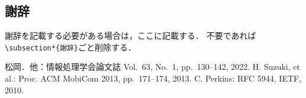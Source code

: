 \documentclass[a4j,9pt,twocolumn,uplatex]{jsarticle}
\begin{document}
\subsection*{謝辞}
謝辞を記載する必要がある場合は，ここに記載する．
不要であれば\verb|\subsection*{謝辞}|ごと削除する．


\begin{thebibliography}{9}      %
     松岡．他：情報処理学会論文誌 Vol.~63, No.~1, pp.~130--142, 2022.
     H. Suzuki, et al.: Proc. ACM MobiCom 2013, pp.~171--174, 2013.
     C. Perkins: RFC 5944, IETF, 2010.
\end{thebibliography}
\end{document}
